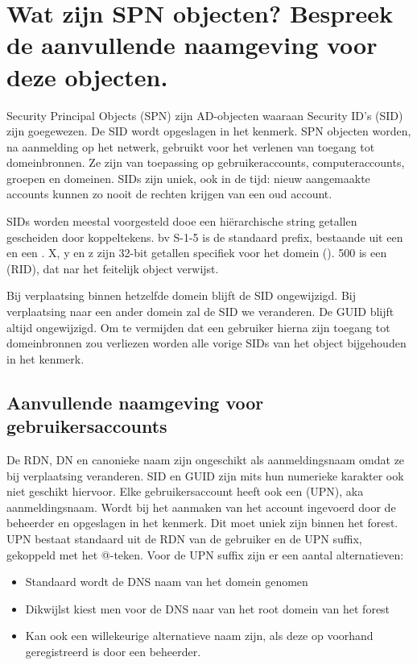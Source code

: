 \section{Wat zijn SPN objecten? Bespreek de aanvullende naamgeving voor deze
objecten.}

Security Principal Objects (SPN) zijn AD-objecten waaraan Security ID's (SID)
zijn goegewezen. De SID wordt opgeslagen in het  kenmerk.
SPN objecten worden, na aanmelding op het netwerk, gebruikt voor het verlenen
van toegang tot domeinbronnen. Ze zijn van toepassing op gebruikeraccounts,
computeraccounts, groepen en domeinen. SIDs zijn uniek, ook in de tijd: nieuw
aangemaakte accounts kunnen zo nooit de rechten krijgen van een oud account.

SIDs worden meestal voorgesteld dooe een hiërarchische string getallen
gescheiden door koppeltekens. bv  S-1-5 is de standaard
prefix, bestaande uit een  en een . X, y en z zijn 32-bit getallen specifiek voor het domein
(). 500 is een 
(RID), dat nar het feitelijk object verwijst.

Bij verplaatsing binnen hetzelfde domein blijft de SID ongewijzigd. Bij
verplaatsing naar een ander domein zal de SID we veranderen. De GUID blijft
altijd ongewijzigd. Om te vermijden dat een gebruiker hierna zijn toegang tot
domeinbronnen zou verliezen worden alle vorige SIDs van het object bijgehouden
in het  kenmerk.

\subsection{Aanvullende naamgeving voor gebruikersaccounts}

De RDN, DN en canonieke naam zijn ongeschikt als aanmeldingsnaam omdat ze bij
verplaatsing veranderen. SID en GUID zijn mits hun numerieke karakter ook niet
geschikt hiervoor. Elke gebruikersaccount heeft ook een  (UPN), aka aanmeldingsnaam. Wordt bij het aanmaken van het account
ingevoerd door de beheerder en opgeslagen in het 
kenmerk. Dit moet uniek zijn binnen het forest. UPN bestaat standaard uit de RDN
van de gebruiker en de UPN suffix, gekoppeld met het @-teken.
Voor de UPN suffix zijn er een aantal alternatieven:
\begin{itemize}
	\item Standaard wordt de DNS naam van het domein genomen
	\item Dikwijlst kiest men voor de DNS naar van het root domein van het
		forest
	\item Kan ook een willekeurige alternatieve naam zijn, als deze op
		voorhand geregistreerd is door een beheerder.
\end{itemize}

